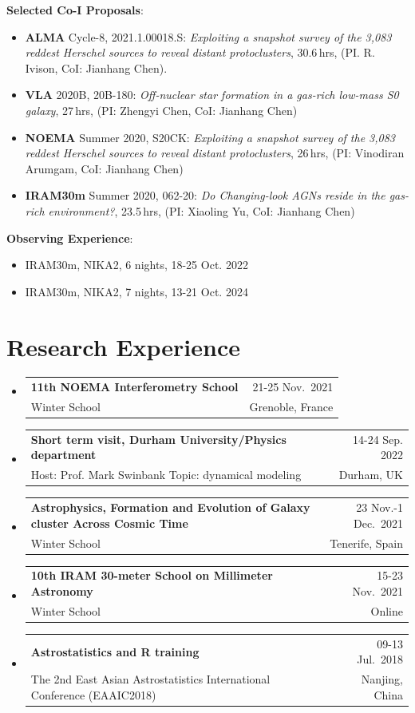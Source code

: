\documentclass[A4,11pt]{article}
\makeatletter
\newcommand{\CVSubheading}[4]{
  \vspace{-2pt}\item
    \begin{tabular*}{0.97\textwidth}[t]{l@{\extracolsep{\fill}}r}
      \textbf{#1} & #2 \\
      \small#3 & \small #4 \\
    \end{tabular*}\vspace{-7pt}
}
\newcommand{\CVSubHeadingListStart}{\begin{itemize}[leftmargin=0.5cm, label={}]}
\newcommand{\CVSubHeadingListEnd}{\end{itemize}}
\newenvironment{paperlist}
{ \begin{itemize}[leftmargin=0.8cm, label={$\bullet$}]
    \setlength{\itemsep}{1pt}
    \setlength{\parskip}{1pt}
    \setlength{\parsep}{1pt}     }
{ \end{itemize}                  }
\makeatother
\begin{document}
{\bf Selected Co-I Proposals}:\\
\vspace{-0.8em}
\begin{paperlist}
    \item {\bf ALMA} Cycle-8, 2021.1.00018.S: \emph{Exploiting a snapshot survey of the 3,083 reddest Herschel sources to reveal distant protoclusters}, 30.6\,hrs, (PI. R. Ivison, CoI: Jianhang Chen).
    \item {\bf VLA} 2020B, 20B-180: \emph{Off-nuclear star formation in a gas-rich low-mass S0 galaxy}, 27\,hrs, (PI: Zhengyi Chen, CoI: Jianhang Chen)
    \item {\bf NOEMA} Summer 2020, S20CK: \emph{Exploiting a snapshot survey of the 3,083 reddest Herschel sources to reveal distant protoclusters}, 26\,hrs, (PI: Vinodiran Arumgam, CoI: Jianhang Chen)
    \item {\bf IRAM30m} Summer 2020, 062-20: \emph{Do Changing-look AGNs reside in the gas-rich environment?}, 23.5\,hrs, (PI: Xiaoling Yu, CoI: Jianhang Chen)
\end{paperlist}

{\bf Observing Experience}:\\
\vspace{-0.8em}
\begin{paperlist}
    \item IRAM30m, NIKA2, 6 nights, 18-25 Oct. 2022
    \item IRAM30m, NIKA2, 7 nights, 13-21 Oct. 2024
\end{paperlist}

\section{Research Experience}
  \CVSubHeadingListStart
    \CVSubheading
      {11th NOEMA Interferometry School}{21-25 Nov.~2021}
      {Winter School}{Grenoble, France}
    \CVSubheading 
      {Short term visit, Durham University/Physics department}{14-24 Sep. 2022}
      {Host: Prof. Mark Swinbank Topic: dynamical modeling}{Durham, UK}
    \CVSubheading 
      {Astrophysics, Formation and Evolution of Galaxy cluster Across Cosmic Time}{23 Nov.-1 Dec.~2021}
      {Winter School}{Tenerife, Spain}
    \CVSubheading 
      {10th IRAM 30-meter School on Millimeter Astronomy}{15-23 Nov.~2021}
      {Winter School}{Online}
    \CVSubheading
      {Astrostatistics and R training}{09-13 Jul.~2018}
      {The 2nd East Asian Astrostatistics International Conference (EAAIC2018)}{Nanjing, China}
  \CVSubHeadingListEnd
\end{document}

